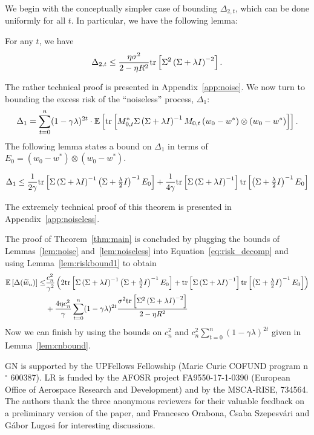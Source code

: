 \documentclass[final,12pt]{colt2018} %
\newcommand{\trace}[1]{\mbox{\normalfont tr}\left[#1\right]}
\newcommand{\EE}[1]{\mathbb{E}\left[#1\right]}
\newcommand{\pa}[1]{\left(#1\right)}
\newcommand{\wt}{\widetilde}
\newcommand{\tw}{\wt{w}}
\newcommand{\redd}[1]{\textcolor{red}{#1}}
\begin{document}
We begin with the conceptually simpler case of bounding $\Delta_{2,t}$, which can be done uniformly for 
all $t$. In particular, we have the following lemma:
\begin{lemma}\label{lem:noise}
For any $t$, we have
 \[
  \Delta_{2,t} \le \frac{\eta \sigma^2}{2 - \eta R^2} \trace{\Sigma^2 \pa{\Sigma + \lambda I}^{-2}}.
 \]
\end{lemma}
The rather technical proof is presented in Appendix~\ref{app:noise}.
We now turn to bounding the excess risk of the ``noiseless'' process, $\Delta_1$:
\[
 \Delta_1
 =
 \sum_{t=0}^n (1-\gamma\lambda)^{2t} \cdot \EE{\trace{M_{0,t}^* \Sigma \pa{\Sigma + \lambda I}^{-1} M_{0,t} \pa{w_0 - w^*}\otimes \pa{w_0 - 
w^*}}}.
\]
The following lemma states a bound on $\Delta_1$ in terms of $E_0 = \pa{w_0 - w^*}\otimes \pa{w_0 - w^*}$.
\begin{lemma}\label{lem:noiseless}
 \[
  \Delta_1 \le \frac {1}{2\gamma} \trace{\Sigma \pa{\Sigma + \lambda I}^{-1} \pa{\Sigma + \textstyle{\frac{\lambda}{2}} I}^{-1} E_0} + 
\frac {1}{4\gamma} \trace{\Sigma \pa{\Sigma + \lambda I}^{-1}}\trace{\pa{\Sigma + \textstyle{\frac{\lambda}{2}} I}^{-1}E_0} 
 \]
\end{lemma}
The extremely technical proof of this theorem is presented in Appendix~\ref{app:noiseless}.

The proof of Theorem~\ref{thm:main} is concluded by plugging the bounds of Lemmas~\ref{lem:noise} and~\ref{lem:noiseless} 
into Equation~\eqref{eq:risk_decomp} and using Lemma~\ref{lem:riskbound1} to obtain
\begin{align*}
 \EE{\Delta(\tw_n)}
 \le &\frac{c_n^2}{\gamma^2} \pa{2 \trace{\Sigma \pa{\Sigma + \lambda I}^{-1} \pa{\Sigma + \textstyle{\frac{\lambda}{2}} I}^{-1} E_0} 
+\trace{\Sigma 
\pa{\Sigma + \lambda I}^{-1}}\trace{\pa{\Sigma + \textstyle{\frac{\lambda}{2}} I}^{-1}E_0}}
\\
&+ \frac{4 \eta c_n^2}{\gamma} \sum_{t=0}^n (1-\gamma\lambda)^{2t} \frac{\sigma^2 \trace{\Sigma^2 \pa{\Sigma + 
\lambda I}^{-2}}}{2 - \eta R^2} 
\end{align*}
Now we can finish by using the bounds on $c_n^2$ and $c_n^2 \sum_{t=0}^n (1-\gamma\lambda)^{2t}$ given in 
Lemma~\ref{lem:cnbound}.



\acks
GN is supported by the UPFellows Fellowship (Marie Curie COFUND program n${^\circ}$ 600387).
LR is funded by the AFOSR project FA9550-17-1-0390 (European Office of Aerospace Research and Development) and by the MSCA-RISE, 734564.
The authors thank the three anonymous reviewers for their valuable feedback on a preliminary version of the paper, and 
Francesco Orabona, Csaba Szepesv\'ari and G\'abor Lugosi for interesting discussions.
\end{document}
